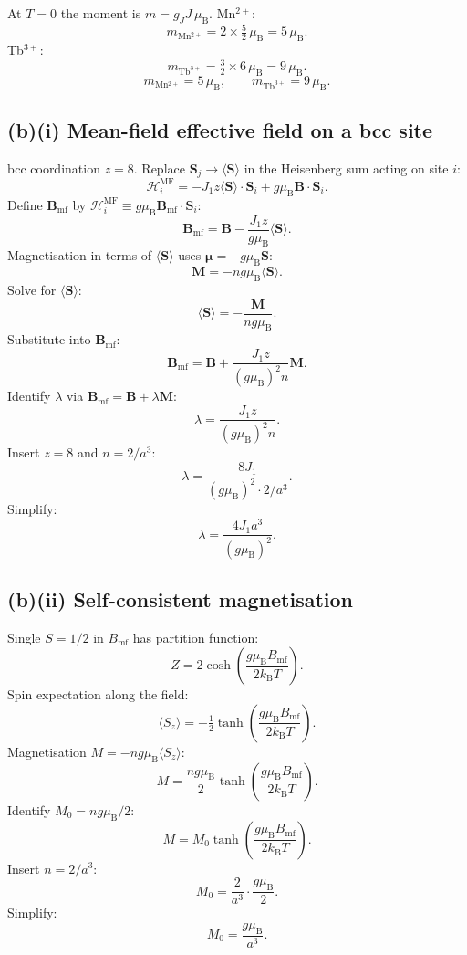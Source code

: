 \documentclass[11pt]{article}
\newcommand{\kB}{k_{\mathrm{B}}}
\newcommand{\muB}{\mu_{\mathrm{B}}}
\begin{document}
At $T=0$ the moment is $m=g_J J\,\muB$. Mn$^{2+}$:
\[
m_{\mathrm{Mn^{2+}}} = 2\times\tfrac52\,\muB = 5\,\muB.
\]
Tb$^{3+}$:
\[
m_{\mathrm{Tb^{3+}}} = \tfrac32\times 6\,\muB = 9\,\muB.
\]
\begin{equation}
\boxed{\ m_{\mathrm{Mn^{2+}}} = 5\,\muB,\qquad m_{\mathrm{Tb^{3+}}} = 9\,\muB.\ }
\label{eq:msatbox}
\end{equation}

\subsection*{(b)(i) Mean-field effective field on a bcc site}

bcc coordination $z=8$. Replace $\mathbf S_j\to\langle\mathbf S\rangle$ in the Heisenberg sum acting on site $i$:
\begin{equation}
\mathcal H_i^{\mathrm{MF}} = -J_1 z\langle\mathbf S\rangle\cdot\mathbf S_i + g\muB\mathbf B\cdot\mathbf S_i.
\label{eq:HMF}
\end{equation}
Define $\mathbf B_{\mathrm{mf}}$ by $\mathcal H_i^{\mathrm{MF}} \equiv g\muB\mathbf B_{\mathrm{mf}}\cdot\mathbf S_i$:
\[
\mathbf B_{\mathrm{mf}} = \mathbf B - \frac{J_1 z}{g\muB}\langle\mathbf S\rangle.
\]
Magnetisation in terms of $\langle\mathbf S\rangle$ uses $\bm\mu = -g\muB\mathbf S$:
\[
\mathbf M = -n g\muB\langle\mathbf S\rangle.
\]
Solve for $\langle\mathbf S\rangle$:
\[
\langle\mathbf S\rangle = -\frac{\mathbf M}{ng\muB}.
\]
Substitute into $\mathbf B_{\mathrm{mf}}$:
\[
\mathbf B_{\mathrm{mf}} = \mathbf B + \frac{J_1 z}{(g\muB)^2 n}\mathbf M.
\]
Identify $\lambda$ via $\mathbf B_{\mathrm{mf}} = \mathbf B + \lambda\mathbf M$:
\[
\lambda = \frac{J_1 z}{(g\muB)^2 n}.
\]
Insert $z=8$ and $n=2/a^3$:
\[
\lambda = \frac{8 J_1}{(g\muB)^2\cdot 2/a^3}.
\]
Simplify:
\begin{equation}
\boxed{\ \lambda = \frac{4 J_1 a^3}{(g\muB)^2}.\ }
\label{eq:lambdabox}
\end{equation}

\subsection*{(b)(ii) Self-consistent magnetisation}

Single $S=1/2$ in $B_{\mathrm{mf}}$ has partition function:
\[
Z = 2\cosh\!\left(\frac{g\muB B_{\mathrm{mf}}}{2\kB T}\right).
\]
Spin expectation along the field:
\[
\langle S_z\rangle = -\tfrac12\tanh\!\left(\frac{g\muB B_{\mathrm{mf}}}{2\kB T}\right).
\]
Magnetisation $M = -ng\muB\langle S_z\rangle$:
\[
M = \frac{ng\muB}{2}\tanh\!\left(\frac{g\muB B_{\mathrm{mf}}}{2\kB T}\right).
\]
Identify $M_0 = ng\muB/2$:
\[
M = M_0\tanh\!\left(\frac{g\muB B_{\mathrm{mf}}}{2\kB T}\right).
\]
Insert $n=2/a^3$:
\[
M_0 = \frac{2}{a^3}\cdot\frac{g\muB}{2}.
\]
Simplify:
\begin{equation}
\boxed{\ M_0 = \frac{g\muB}{a^3}.\ }
\label{eq:M0box}
\end{equation}
\end{document}
